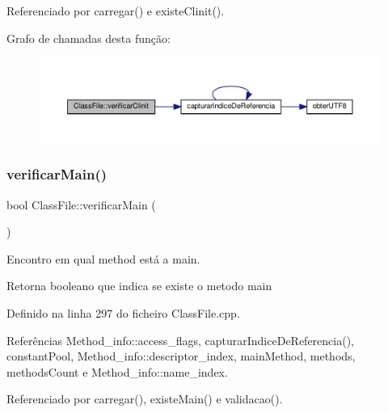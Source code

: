 Referenciado por carregar() e existe\+Clinit().

Grafo de chamadas desta função\+:\nopagebreak
\begin{figure}[H]
\begin{center}
\leavevmode
\includegraphics[width=350pt]{classClassFile_ab0394185a299f35a9b5be68143385e84_cgraph}
\end{center}
\end{figure}
\mbox{\label{classClassFile_ae8e4445e763c4ee7c04995fcea0369e0}} 
\subsubsection{\texorpdfstring{verificar\+Main()}{verificarMain()}}
{\footnotesize\ttfamily bool Class\+File\+::verificar\+Main (\begin{DoxyParamCaption}{ }\end{DoxyParamCaption})\hspace{0.3cm}{\ttfamily [private]}}



Encontro em qual method está a main. 

\begin{DoxyReturn}{Retorna}
booleano que indica se existe o metodo main 
\end{DoxyReturn}


Definido na linha 297 do ficheiro Class\+File.\+cpp.



Referências Method\+\_\+info\+::access\+\_\+flags, capturar\+Indice\+De\+Referencia(), constant\+Pool, Method\+\_\+info\+::descriptor\+\_\+index, main\+Method, methods, methods\+Count e Method\+\_\+info\+::name\+\_\+index.



Referenciado por carregar(), existe\+Main() e validacao().

